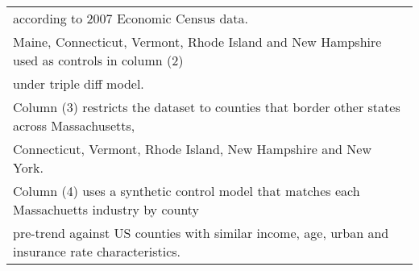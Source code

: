 {\begin{tabular}{l*{4}{c}}
\multicolumn{5}{l}{\footnotesize  \space according to 2007 Economic Census data.}\\
\multicolumn{5}{l}{\footnotesize Maine, Connecticut, Vermont, Rhode Island and New Hampshire used as controls in column (2) }\\
\multicolumn{5}{l}{\footnotesize \space under triple diff model. }\\
\multicolumn{5}{l}{\footnotesize Column (3) restricts the dataset to counties that border other states across Massachusetts, }\\
\multicolumn{5}{l}{\footnotesize \space Connecticut, Vermont, Rhode Island, New Hampshire and New York. }\\
\multicolumn{5}{l}{\footnotesize Column (4) uses a synthetic control model that matches each Massachuetts industry by county }\\
\multicolumn{5}{l}{\footnotesize \space pre-trend against US counties with similar income, age, urban and insurance rate characteristics. }\\
\end{tabular}
}
